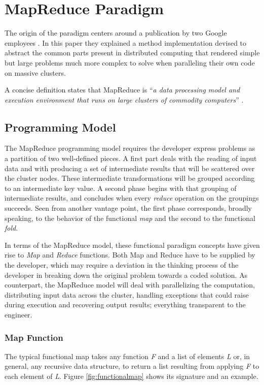 \section{MapReduce Paradigm}\label{sec:mapred}
\noindent The origin of the paradigm centers around a publication by two Google employees \cite{googlemapreduce}. In this paper they explained a method implementation devised to abstract the common parts present in distributed computing that rendered simple but large problems much more complex to solve when paralleling their own code on massive clusters.

A concise definition states that MapReduce is ``\emph{a data processing model and execution environment that runs on large clusters of commodity computers}'' \cite{hadoopdefguide}.

\subsection{Programming Model}\label{subsec:programacionmapred}
\noindent The MapReduce programming model requires the developer express problems as a partition of two well-defined pieces. A first part deals with the reading of input data and with producing a set of intermediate results that will be scattered over the cluster nodes. These intermediate transformations will be grouped according to an intermediate key value. A second phase begins with that grouping of intermediate results, and concludes when every \emph{reduce} operation on the groupings succeeds. Seen from another vantage point, the first phase corresponds, broadly speaking, to the behavior of the functional \emph{map} and the second to the functional \emph{fold}.

In terms of the MapReduce model, these functional paradigm concepts have given rise to \emph{Map} and \emph{Reduce} functions. Both Map and Reduce have to be supplied by the developer, which may require a deviation in the thinking process of the developer in breaking down the original problem towards a coded solution. As counterpart, the MapReduce model will deal with parallelizing the computation, distributing input data across the cluster, handling exceptions that could raise during execution and recovering output results; everything transparent to the engineer.

\subsubsection{Map Function}\label{map}
\noindent The typical functional map takes any function \emph{F} and a list of elements \emph{L} or, in general, any recursive data structure, to return a list resulting from applying \emph{F} to each element of \emph{L}. Figure \ref{fig:functionalmap} shows its signature and an example.

